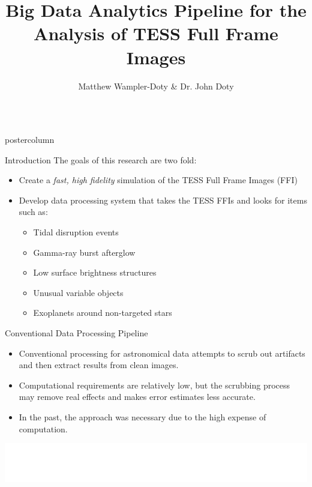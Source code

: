 \documentclass[final,hyperref={pdfpagelabels=false}]{beamer}
\title{\LARGE Big Data Analytics Pipeline for the Analysis of TESS Full Frame Images}
\author{Matthew Wampler-Doty \& Dr. John Doty}
\institute[Noqsi Aerospace]{Noqsi Aerospace, Ltd. \& MIT}
\date[]{}
\newlength{\columnheight}
\begin{document}
\begin{frame}
  \begin{columns}
    \begin{column}{.49\textwidth}
      \begin{beamercolorbox}[center,wd=\textwidth]{postercolumn}
        \begin{minipage}[T]{.95\textwidth}  %
          \parbox[t][\columnheight]{\textwidth}{
            \begin{block}{Introduction}
            The goals of this research are two fold:
              \begin{itemize}
              \item Create a \emph{fast, high fidelity} simulation of the TESS Full Frame Images (FFI)
              \item Develop data processing system that takes the TESS FFIs and looks for items such as:
              \begin{itemize}
              	\item Tidal disruption events
	        \item Gamma-ray burst afterglow
		\item Low surface brightness structures
		\item Unusual variable objects
		\item Exoplanets around non-targeted stars
              \end{itemize}
              \end{itemize}              
            \end{block}

            \vspace{2cm}
            \begin{block}{Conventional Data Processing Pipeline}
            \begin{itemize}
              	\item Conventional processing for astronomical data attempts to scrub out artifacts and then extract results from clean images.
		\item Computational requirements are relatively low, but the scrubbing process may remove real effects and makes error estimates less accurate.
		\item In the past, the approach was necessary due to the high expense of computation.
	    \end{itemize}
              \includegraphics[width=0.95\linewidth]{figures/Conventional_Pipeline.pdf}
            \end{block}

}
\end{minipage}
\end{beamercolorbox}
\end{column}
\end{columns}
\end{frame}
\end{document}
